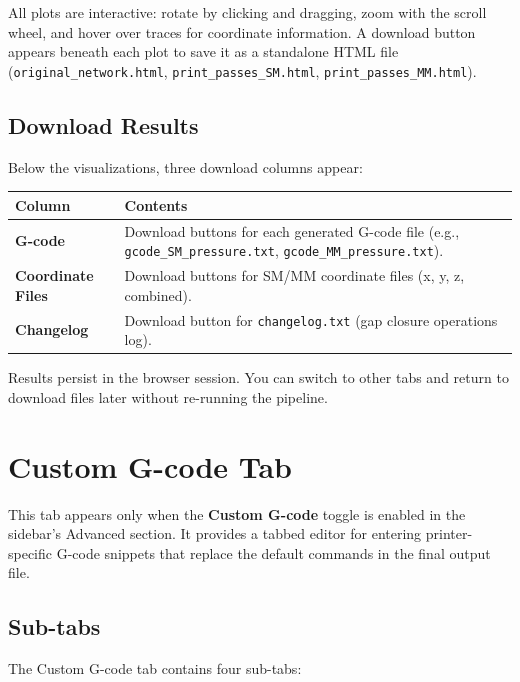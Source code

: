 \documentclass[11pt,letterpaper]{article}
\newcommand{\code}[1]{\texttt{#1}}
\newcommand{\gui}[1]{\textcolor{guicolor}{\textsf{\textbf{#1}}}}
\begin{document}
All plots are interactive: rotate by clicking and dragging, zoom with the scroll
wheel, and hover over traces for coordinate information.  A download button
appears beneath each plot to save it as a standalone HTML file
(\code{original\_network.html}, \code{print\_passes\_SM.html},
\code{print\_passes\_MM.html}).

\subsection{Download Results}

Below the visualizations, three download columns appear:

\begin{tabularx}{\textwidth}{l X}
\toprule
\textbf{Column} & \textbf{Contents} \\
\midrule
\textbf{G-code} & Download buttons for each generated G-code file (e.g., \code{gcode\_SM\_pressure.txt}, \code{gcode\_MM\_pressure.txt}). \\
\textbf{Coordinate Files} & Download buttons for SM/MM coordinate files (x, y, z, combined). \\
\textbf{Changelog} & Download button for \code{changelog.txt} (gap closure operations log). \\
\bottomrule
\end{tabularx}

\begin{tipbox}
Results persist in the browser session. You can switch to other tabs and return to download files later without re-running the pipeline.
\end{tipbox}

\section{Custom G-code Tab}
\label{sec:custom-gcode}

This tab appears only when the \gui{Custom G-code} toggle is enabled in the
sidebar's Advanced section. It provides a tabbed editor for entering
printer-specific G-code snippets that replace the default commands in the
final output file.

\subsection{Sub-tabs}

The Custom G-code tab contains four sub-tabs:
\end{document}
